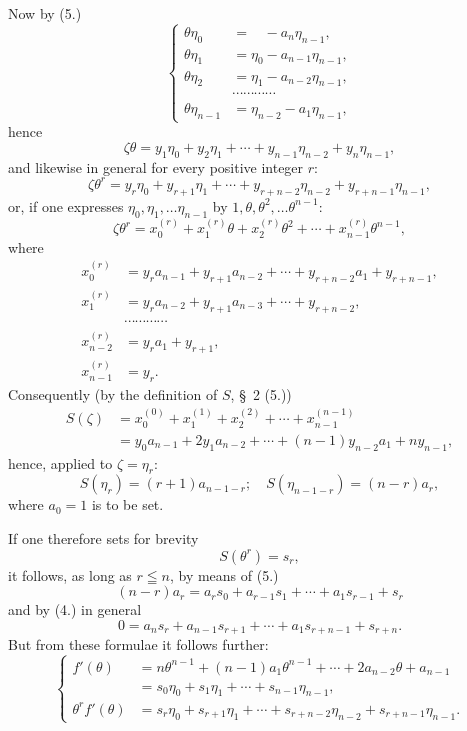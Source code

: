 \documentclass{article}
\begin{document}
Now by (5.)
\[ \left\{ \begin{aligned} \theta\eta_{0} &= \phantom{\eta_{0}} - a_{n}\eta_{n-1}, \\ \theta\eta_{1} &= \eta_{0} - a_{n-1}\eta_{n-1}, \\ \theta\eta_{2} &= \eta_{1} - a_{n-2}\eta_{n-1}, \\ &\cdots\cdots\cdots\cdots \\ \theta\eta_{n-1} &= \eta_{n-2} - a_{1}\eta_{n-1}, \end{aligned} \right. \tag{7.} \]
hence
\[ \zeta\theta = y_{1}\eta_{0} + y_{2}\eta_{1} + \cdots + y_{n-1}\eta_{n-2} + y_{n}\eta_{n-1}, \]
and likewise in general for every positive integer $r$:
\[ \zeta\theta^{r} = y_{r}\eta_{0} + y_{r+1}\eta_{1} + \cdots + y_{r+n-2}\eta_{n-2} + y_{r+n-1}\eta_{n-1}, \]
or, if one expresses $\eta_{0}, \eta_{1}, \ldots \eta_{n-1}$ by $1, \theta, \theta^{2}, \ldots \theta^{n-1}$:
\[ \zeta\theta^{r} = x_{0}^{(r)} + x_{1}^{(r)}\theta + x_{2}^{(r)}\theta^{2} + \cdots + x_{n-1}^{(r)}\theta^{n-1}, \]
where
\[ \begin{aligned} x_{0}^{(r)} &= y_{r}a_{n-1} + y_{r+1}a_{n-2} + \cdots + y_{r+n-2}a_{1} + y_{r+n-1}, \\ x_{1}^{(r)} &= y_{r}a_{n-2} + y_{r+1}a_{n-3} + \cdots + y_{r+n-2}, \\ &\cdots\cdots\cdots\cdots \\ x_{n-2}^{(r)} &= y_{r}a_{1} + y_{r+1}, \\ x_{n-1}^{(r)} &= y_{r}. \end{aligned} \]
Consequently (by the definition of $S$, §~2 (5.))
\[ \begin{aligned} S(\zeta) &= x_{0}^{(0)} + x_{1}^{(1)} + x_{2}^{(2)} + \cdots + x_{n-1}^{(n-1)} \\ &= y_{0}a_{n-1} + 2y_{1}a_{n-2} + \cdots + (n-1)y_{n-2}a_{1} + ny_{n-1}, \end{aligned} \]
hence, applied to $\zeta = \eta_{r}$:
\[ S(\eta_{r}) = (r+1)a_{n-1-r}; \quad S(\eta_{n-1-r}) = (n-r)a_{r}, \]
where $a_{0} = 1$ is to be set.

If one therefore sets for brevity
\[ S(\theta^{r}) = s_{r}, \]
it follows, as long as $r \leqq n$, by means of (5.)
\[ (n-r)a_{r} = a_{r}s_{0} + a_{r-1}s_{1} + \cdots + a_{1}s_{r-1} + s_{r} \tag{8.} \]
and by (4.) in general
\[ 0 = a_{n}s_{r} + a_{n-1}s_{r+1} + \cdots + a_{1}s_{r+n-1} + s_{r+n}. \tag{9.} \]
But from these formulae it follows further:
\[ \left\{ \begin{aligned} f'(\theta) &= n\theta^{n-1} + (n-1)a_{1}\theta^{n-1} + \cdots + 2a_{n-2}\theta + a_{n-1} \\ &= s_{0}\eta_{0} + s_{1}\eta_{1} + \cdots + s_{n-1}\eta_{n-1}, \\ \theta^{r}f'(\theta) &= s_{r}\eta_{0} + s_{r+1}\eta_{1} + \cdots + s_{r+n-2}\eta_{n-2} + s_{r+n-1}\eta_{n-1}. \end{aligned} \right. \tag{10.} \]
\end{document}
